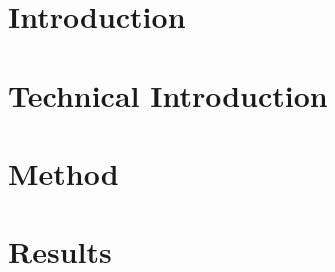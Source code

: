 \documentclass[fontsize=11pt,bibliography=totoc]{scrbook}
\begin{document}
	\renewcommand{\cftfigindent}{10pt}
	\renewcommand{\cftfignumwidth}{37pt}


\listoffigures

	
	\renewcommand{\cfttabindent}{10pt}
	\renewcommand{\cfttabnumwidth}{37pt}


\listoftables










	\printglossary[type=acronym, title=List of Abbreviations]




\mainmatter
	
	
	
	
	
	
	
\chapter{Introduction}
\label{ch:intro}
\chapter{Technical Introduction}
\label{ch:techintro}
\chapter{Method}
\label{ch:method}
\chapter{Results}
\label{ch:results}
\end{document}
